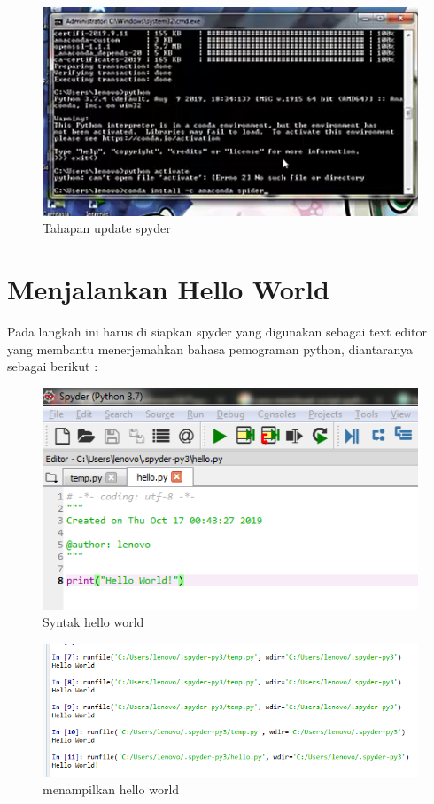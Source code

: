 	\begin{figure}
	\includegraphics[scale=0.5]{section/10.png}
	\centering
	\caption{Tahapan update spyder}
	\end{figure}

\section{Menjalankan Hello World}
Pada langkah ini harus di siapkan spyder yang digunakan sebagai text editor yang membantu menerjemahkan bahasa pemograman python, diantaranya sebagai berikut :

	\begin{figure}
	\includegraphics[scale=0.5]{section/11.png}
	\centering
	\caption{Syntak hello world}
	\end{figure}

	\begin{figure}
	\includegraphics[scale=0.5]{section/12.png}
	\centering
	\caption{menampilkan hello world}
	\end{figure}


